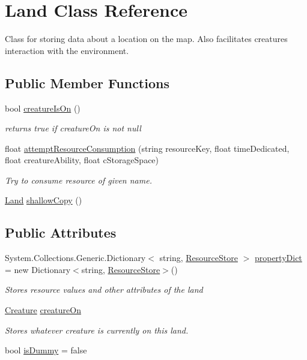 \hypertarget{class_land}{}\section{Land Class Reference}
\label{class_land}


Class for storing data about a location on the map. Also facilitates creature\textquotesingle{}s interaction with the environment.  


\subsection*{Public Member Functions}
\begin{DoxyCompactItemize}
\item 
bool \mbox{\hyperlink{class_land_ad66a06c6c305a42c12c5b63410242251}{creature\+Is\+On}} ()
\begin{DoxyCompactList}\small\item\em returns true if creature\+On is not null \end{DoxyCompactList}\item 
float \mbox{\hyperlink{class_land_ad2eefda30f5859bb62fc33804f445e20}{attempt\+Resource\+Consumption}} (string resource\+Key, float time\+Dedicated, float creature\+Ability, float c\+Storage\+Space)
\begin{DoxyCompactList}\small\item\em Try to consume resource of given name. \end{DoxyCompactList}\item 
\mbox{\hyperlink{class_land}{Land}} \mbox{\hyperlink{class_land_a39ae866c981982746dd04515bbab8238}{shallow\+Copy}} ()
\end{DoxyCompactItemize}
\subsection*{Public Attributes}
\begin{DoxyCompactItemize}
\item 
System.\+Collections.\+Generic.\+Dictionary$<$ string, \mbox{\hyperlink{class_resource_store}{Resource\+Store}} $>$ \mbox{\hyperlink{class_land_adcbc195ca2ec38fb30d0ef5e2fde4397}{property\+Dict}} = new Dictionary$<$string, \mbox{\hyperlink{class_resource_store}{Resource\+Store}}$>$()
\begin{DoxyCompactList}\small\item\em Stores resource values and other attributes of the land \end{DoxyCompactList}\item 
\mbox{\hyperlink{class_creature}{Creature}} \mbox{\hyperlink{class_land_a3cab3cf218bd21e41181b908bd76a053}{creature\+On}}
\begin{DoxyCompactList}\small\item\em Stores whatever creature is currently on this land. \end{DoxyCompactList}\item 
bool \mbox{\hyperlink{class_land_a309b7300b5d1bcdfec0fd7db41a94cc3}{is\+Dummy}} = false
\end{DoxyCompactItemize}


